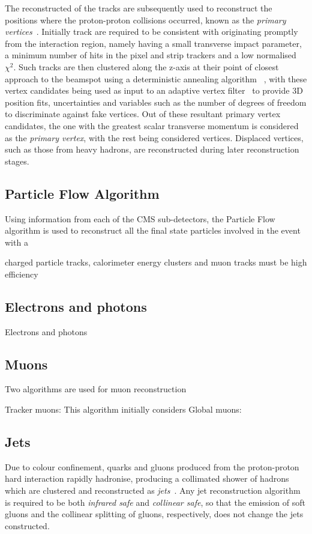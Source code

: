 {%
The reconstructed of the tracks are subsequently used to reconstruct the positions where the proton-proton collisions occurred, known as the \emph{primary vertices}~\cite{Speer:2006mh,Chatrchyan:2014fea}.
Initially track are required to be consistent with originating promptly from the interaction region, namely having a small transverse impact parameter, a minimum number of hits in the pixel and strip trackers and a low normalised $\chi^{2}$.
Such tracks are then clustered along the z-axis at their point of closest approach to the beamspot using a deterministic annealing algorithm	~\cite{Kenneth:1998i}, with these vertex candidates being used as input to an adaptive vertex filter~\cite{Fruhwirth:2007hz} to provide 3D position fits, uncertainties and variables such as the number of degrees of freedom to discriminate against fake vertices.
Out of these resultant primary vertex candidates, the one with the greatest scalar transverse momentum is considered as the \emph{primary vertex}, with the rest being considered \PU vertices.
Displaced vertices, such as those from heavy hadrons, are reconstructed during later reconstruction stages.

\subsection{Particle Flow Algorithm}
Using information from each of the CMS sub-detectors, the Particle Flow algorithm is used to reconstruct all the final state particles involved in the event with a 


charged particle tracks, calorimeter energy clusters and muon tracks
must be high efficiency 
 
\subsection{Electrons and photons}
Electrons and photons 
\subsection{Muons}
Two algorithms are used for muon reconstruction 

Tracker muons:
This algorithm initially considers  
Global muons:

\subsection{Jets}
Due to colour confinement, quarks and gluons produced from the proton-proton hard interaction rapidly hadronise, producing a collimated shower of hadrons which are clustered and reconstructed as \emph{jets}~\cite{Salam:2009jx}.
Any jet reconstruction algorithm is required to be both \emph{infrared safe} and \emph{collinear safe}, \ie so that the emission of soft gluons and the collinear splitting of gluons, respectively, does not change the jets constructed.

}
